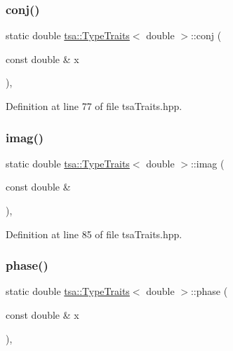 \subsubsection{\texorpdfstring{conj()}{conj()}}
{\footnotesize\ttfamily static double \hyperlink{classtsa_1_1_type_traits}{tsa\+::\+Type\+Traits}$<$ double $>$\+::conj (\begin{DoxyParamCaption}\item[{const double \&}]{x }\end{DoxyParamCaption})\hspace{0.3cm}{\ttfamily [inline]}, {\ttfamily [static]}}



Definition at line 77 of file tsa\+Traits.\+hpp.

\mbox{\label{classtsa_1_1_type_traits_3_01double_01_4_a98ded872afb62012bd9595b1b032fb7e}} 
\subsubsection{\texorpdfstring{imag()}{imag()}}
{\footnotesize\ttfamily static double \hyperlink{classtsa_1_1_type_traits}{tsa\+::\+Type\+Traits}$<$ double $>$\+::imag (\begin{DoxyParamCaption}\item[{const double \&}]{ }\end{DoxyParamCaption})\hspace{0.3cm}{\ttfamily [inline]}, {\ttfamily [static]}}



Definition at line 85 of file tsa\+Traits.\+hpp.

\mbox{\label{classtsa_1_1_type_traits_3_01double_01_4_a6488c1cb2f330e72537a488589197df6}} 
\subsubsection{\texorpdfstring{phase()}{phase()}}
{\footnotesize\ttfamily static double \hyperlink{classtsa_1_1_type_traits}{tsa\+::\+Type\+Traits}$<$ double $>$\+::phase (\begin{DoxyParamCaption}\item[{const double \&}]{x }\end{DoxyParamCaption})\hspace{0.3cm}{\ttfamily [inline]}, {\ttfamily [static]}}



